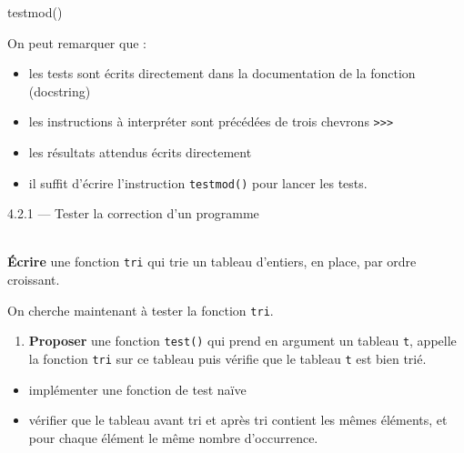 \documentclass[a4paper,17pt]{extarticle}
\newenvironment{eleve}%
{\begin{activite}\color{noiramu}\\[-0.5cm]}
{\end{activite}}
\providecommand{\tightlist}{%
      \setlength{\itemsep}{0pt}\setlength{\parskip}{0pt}}
\newenvironment{Shaded}{}{}
\newcommand{\NormalTok}[1]{{#1}}
\begin{document}
\begin{exemple}
\begin{Shaded}
\begin{Highlighting}[]
\NormalTok{testmod()}
\end{Highlighting}
\end{Shaded}

On peut remarquer que :

\begin{itemize}
\tightlist
\item
  les tests sont écrits directement dans la documentation de la fonction
  (docstring)
\item
  les instructions à interpréter sont précédées de trois chevrons
  \texttt{\textgreater{}\textgreater{}\textgreater{}}
\item
  les résultats attendus écrits directement
\item
  il suffit d'écrire l'instruction \texttt{testmod()} pour lancer les
  tests.
\end{itemize}

        \end{exemple}
    4.2.1 --- Tester la correction d'un programme
\begin{eleve}
    \textbf{Écrire} une fonction \texttt{tri} qui trie un tableau d'entiers,
en place, par ordre croissant.

On cherche maintenant à tester la fonction \texttt{tri}.

\begin{enumerate}
\def\labelenumi{\arabic{enumi}.}
\setcounter{enumi}{1}
\tightlist
\item
  \textbf{Proposer} une fonction \texttt{test()} qui prend en argument
  un tableau \texttt{t}, appelle la fonction \texttt{tri} sur ce tableau
  puis vérifie que le tableau \texttt{t} est bien trié.
\end{enumerate}

\begin{itemize}
\tightlist
\item
  implémenter une fonction de test naïve
\item
  vérifier que le tableau avant tri et après tri contient les mêmes
  éléments, et pour chaque élément le même nombre d'occurrence.
\end{itemize}
        
        \end{eleve}
\end{document}
